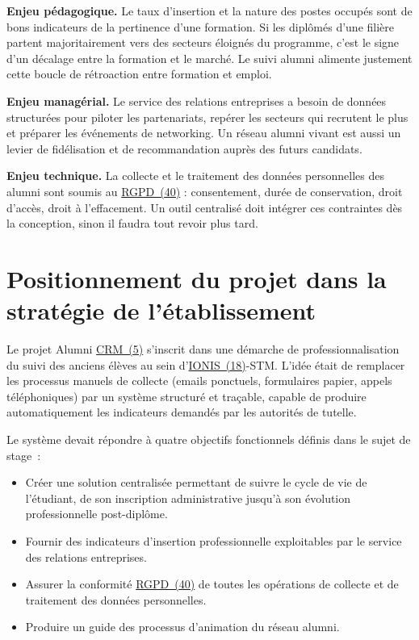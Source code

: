 \documentclass[12pt,a4paper]{report}
\begin{document}
\textbf{Enjeu pédagogique.} Le taux d'insertion et la nature des postes occupés sont de bons indicateurs de la pertinence d'une formation. Si les diplômés d'une filière partent majoritairement vers des secteurs éloignés du programme, c'est le signe d'un décalage entre la formation et le marché. Le suivi alumni alimente justement cette boucle de rétroaction entre formation et emploi.

\textbf{Enjeu managérial.} Le service des relations entreprises a besoin de données structurées pour piloter les partenariats, repérer les secteurs qui recrutent le plus et préparer les événements de networking. Un réseau alumni vivant est aussi un levier de fidélisation et de recommandation auprès des futurs candidats.

\textbf{Enjeu technique.} La collecte et le traitement des données personnelles des alumni sont soumis au \hyperlink{abbr-RGPD}{RGPD~(40)} : consentement, durée de conservation, droit d'accès, droit à l'effacement. Un outil centralisé doit intégrer ces contraintes dès la conception, sinon il faudra tout revoir plus tard.

\section{Positionnement du projet dans la stratégie de l'établissement}

Le projet Alumni \hyperlink{abbr-CRM}{CRM~(5)} s'inscrit dans une démarche de professionnalisation du suivi des anciens élèves au sein d'\hyperlink{abbr-IONIS}{IONIS~(18)}-STM. L'idée était de remplacer les processus manuels de collecte (emails ponctuels, formulaires papier, appels téléphoniques) par un système structuré et traçable, capable de produire automatiquement les indicateurs demandés par les autorités de tutelle.

Le système devait répondre à quatre objectifs fonctionnels définis dans le sujet de stage~:

\begin{itemize}
  \item Créer une solution centralisée permettant de suivre le cycle de vie de l'étudiant, de son inscription administrative jusqu'à son évolution professionnelle post-diplôme.
  \item Fournir des indicateurs d'insertion professionnelle exploitables par le service des relations entreprises.
  \item Assurer la conformité \hyperlink{abbr-RGPD}{RGPD~(40)} de toutes les opérations de collecte et de traitement des données personnelles.
  \item Produire un guide des processus d'animation du réseau alumni.
\end{itemize}
\end{document}
